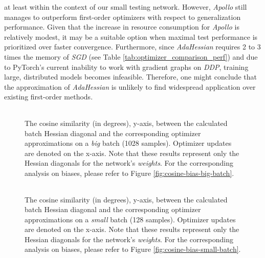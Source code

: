 at least within the context of our small testing network. However, \emph{Apollo} still manages to outperform first-order optimizers with respect to generalization performance.
Given that the increase in resource consumption for \emph{Apollo} is relatively modest, it may be a suitable option when maximal test performance is prioritized over faster convergence.
Furthermore, since \emph{AdaHessian} requires 2 to 3 times the memory of \emph{SGD} (see Table \ref{tab:optimizer_comparison_perf})
and due to PyTorch's current inability to work with gradient graphs on \emph{DDP}, training large, distributed models becomes infeasible.
Therefore, one might conclude that the approximation of \emph{AdaHessian} is unlikely to find widespread application over existing first-order methods.
\begin{figure}[h!]
    \centering
    \begin{tabular}{cc}
         \\ %
    \end{tabular}
    \caption{The cosine similarity (in degrees), y-axis, between the calculated batch Hessian diagonal and the corresponding optimizer approximations on a \emph{big} batch (1028 samples).
    Optimizer updates are denoted on the x-axis.
    Note that these results represent only the Hessian diagonals for the network's \emph{weights}. For the corresponding analysis on biases, please refer to Figure \ref{fig:cosine-bias-big-batch}.}
    \label{fig:cosine-big-batch}
\end{figure}


\begin{figure}[h!]
    \centering
    \begin{tabular}{cc}
         \\ %
    \end{tabular}
    \caption{The cosine similarity (in degrees), y-axis, between the calculated batch Hessian diagonal and the corresponding optimizer approximations on a \emph{small} batch (128 samples).
    Optimizer updates are denoted on the x-axis.
    Note that these results represent only the Hessian diagonals for the network's \emph{weights}. For the corresponding analysis on biases, please refer to Figure \ref{fig:cosine-bias-small-batch}.
}
    \label{fig:cosine-small-batch}
\end{figure}

